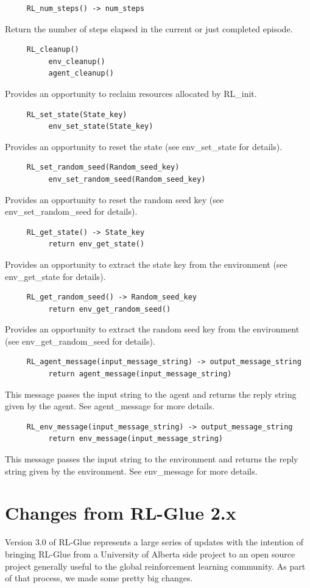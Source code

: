 \documentclass[11pt]{article}
\begin{document}
\begin{verbatim}
     RL_num_steps() -> num_steps
\end{verbatim}
Return the number of steps elapsed in the current or just completed episode.
\begin{verbatim}
     RL_cleanup()
          env_cleanup()
          agent_cleanup()
\end{verbatim}
Provides an opportunity to reclaim resources allocated by RL\_init.
\begin{verbatim}
     RL_set_state(State_key)
          env_set_state(State_key)    
\end{verbatim}
Provides an opportunity to reset the state (see env\_set\_state for details).
\begin{verbatim}
     RL_set_random_seed(Random_seed_key)
          env_set_random_seed(Random_seed_key)
\end{verbatim}
Provides an opportunity to reset the random seed key (see env\_set\_random\_seed for details).
\begin{verbatim}
     RL_get_state() -> State_key
          return env_get_state()  
\end{verbatim}
Provides an opportunity to extract the state key from the environment (see env\_get\_state for details).
\begin{verbatim}
     RL_get_random_seed() -> Random_seed_key
          return env_get_random_seed()   
\end{verbatim}
Provides an opportunity to extract the random seed key from the environment (see env\_get\_random\_seed for details).               
\begin{verbatim}
     RL_agent_message(input_message_string) -> output_message_string
          return agent_message(input_message_string)
\end{verbatim}
This message passes the input string to the agent and returns the reply string given by the agent. See agent\_message for more details.                
\begin{verbatim}
     RL_env_message(input_message_string) -> output_message_string
          return env_message(input_message_string)
\end{verbatim}
This message passes the input string to the environment and returns the reply string given by the environment. See env\_message for more details. 

\section{Changes from RL-Glue 2.x}
\label{change}
Version 3.0 of RL-Glue represents a large series of updates with the intention of bringing RL-Glue from a University of Alberta side project to an open source project generally useful to the global
reinforcement learning community.  As part of that process, we made some pretty big changes.
\end{document}
